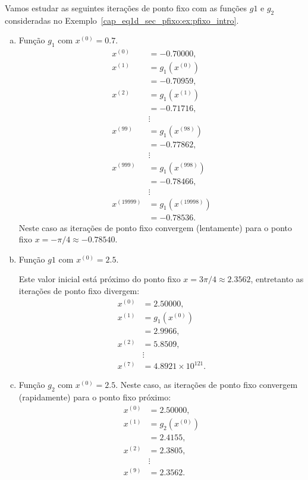 \begin{ex}
  Vamos estudar as seguintes iterações de ponto fixo com as funções $g1$ e $g_2$ consideradas no Exemplo~\ref{cap_eq1d_sec_pfixo:ex:pfixo_intro}.
  \begin{enumerate}[a)]
  \item Função $g_1$ com $x^{(0)} = 0.7$.
    \begin{align}
      x^{(0)} &= -0.70000,\\
      x^{(1)} &= g_1\left(x^{(0)}\right)\\
              &= -0.70959,\\
      x^{(2)} &= g_1\left(x^{(1)}\right)\\
              &=-0.71716,\\
              &\vdots \nonumber\\
      x^{(99)} &= g_1\left(x^{(98)}\right)\\
              &= -0.77862,\\
              &\vdots \nonumber\\
      x^{(999)} &= g_1\left(x^{(998)}\right)\\
              &= -0.78466,\\    
              &\vdots \nonumber\\
      x^{(19999)} &= g_1\left(x^{(19998)}\right)\\
              &= -0.78536.
    \end{align}
    Neste caso as iterações de ponto fixo convergem (lentamente) para o ponto fixo $x=-\pi/4\approx -0.78540$.

  \item Função $g1$ com $x^{(0)} = 2.5$.
    
    Este valor inicial está próximo do ponto fixo $x=3\pi/4\approx 2.3562$, entretanto as iterações de ponto fixo divergem:
    \begin{align}
      x^{(0)} &= 2.50000,\\
      x^{(1)} &= g_1\left(x^{(0)}\right)\\
              &= 2.9966,\\
      x^{(2)} &= 5.8509,\\
              &\vdots \nonumber\\
      x^{(7)} &= 4.8921\times 10^{121}.
    \end{align}
    
  \item Função $g_2$ com $x^{(0)} = 2.5$.
    Neste caso, as iterações de ponto fixo convergem (rapidamente) para o ponto fixo próximo:
    \begin{align}
      x^{(0)} &= 2.50000,\\
      x^{(1)} &= g_2\left(x^{(0)}\right)\\
              &= 2.4155,\\
      x^{(2)} &= 2.3805,\\
              &\vdots \\
      x^{(9)} &= 2.3562.
    \end{align}    
  \end{enumerate}
\end{ex}

